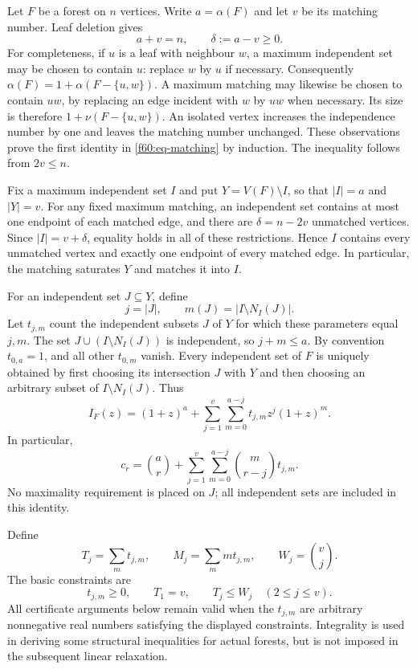Let $F$ be a forest on $n$ vertices.  Write $a=\alpha(F)$ and let $v$ be
its matching number.  Leaf deletion gives
\begin{equation}
 a+v=n,\qquad \delta:=a-v\ge0.
 \label{f60:eq-matching}
\end{equation}
For completeness, if $u$ is a leaf with neighbour $w$, a maximum
independent set may be chosen to contain $u$: replace $w$ by $u$ if
necessary.  Consequently
$\alpha(F)=1+\alpha(F-\{u,w\})$.  A maximum matching may likewise be
chosen to contain $uw$, by replacing an edge incident with $w$ by $uw$
when necessary.  Its size is therefore $1+\nu(F-\{u,w\})$.  An isolated
vertex increases the independence number by one and leaves the matching
number unchanged.  These observations prove the first identity in
\eqref{f60:eq-matching} by induction.  The inequality follows from
$2v\le n$.

Fix a maximum independent set $I$ and put $Y=V(F)\setminus I$, so that
$|I|=a$ and $|Y|=v$.  For any fixed maximum matching, an independent set
contains at most one endpoint of each matched edge, and there are
$\delta=n-2v$ unmatched vertices.  Since $|I|=v+\delta$, equality holds
in all of these restrictions.  Hence $I$ contains every unmatched vertex
and exactly one endpoint of every matched edge.  In particular, the
matching saturates $Y$ and matches it into $I$.

For an independent set $J\subseteq Y$, define
\[
 j=|J|,\qquad m(J)=|I\setminus N_I(J)|.
\]
Let $t_{j,m}$ count the independent subsets $J$ of $Y$ for which these
parameters equal $j,m$.  The set $J\cup(I\setminus N_I(J))$ is independent,
so $j+m\le a$.  By convention $t_{0,a}=1$, and all other $t_{0,m}$ vanish.
Every independent set of $F$ is uniquely obtained by first choosing its
intersection $J$ with $Y$ and then choosing an arbitrary subset of
$I\setminus N_I(J)$.  Thus
\begin{equation}
 I_F(z)=(1+z)^a+
 \sum_{j=1}^{v}\sum_{m=0}^{a-j}t_{j,m}z^j(1+z)^m.
 \label{f60:eq-decomposition}
\end{equation}
In particular,
\begin{equation}
 c_r=\binom ar+
 \sum_{j=1}^{v}\sum_{m=0}^{a-j}\binom m{r-j}t_{j,m}.
 \label{f60:eq-coefficients}
\end{equation}
No maximality requirement is placed on $J$; all independent sets are
included in this identity.

Define
\begin{equation}
 T_j=\sum_m t_{j,m},\qquad M_j=\sum_m mt_{j,m},\qquad
 W_j=\binom vj.
 \label{f60:eq-layer-notation}
\end{equation}
The basic constraints are
\begin{equation}
 t_{j,m}\ge0,\qquad T_1=v,\qquad T_j\le W_j\quad(2\le j\le v).
 \label{f60:eq-basic-counts}
\end{equation}
All certificate arguments below remain valid when the $t_{j,m}$ are
arbitrary nonnegative real numbers satisfying the displayed constraints.
Integrality is used in deriving some structural inequalities for actual
forests, but is not imposed in the subsequent linear relaxation.

